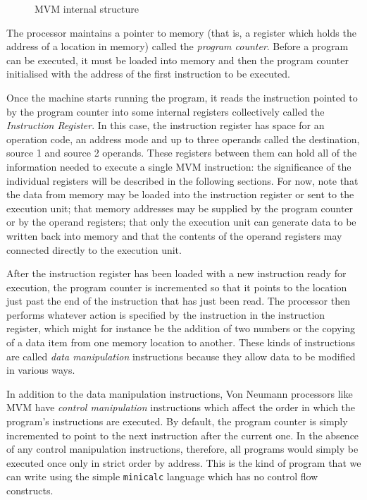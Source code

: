 \begin{figure}
\begin{center}\end{center}
\caption{MVM internal structure}
\label{MVM:block}
\end{figure}

The processor maintains a pointer to memory (that is, a register which
holds the address of a location in memory) called the {\em program
counter}. Before a program can be executed, it must be loaded into
memory and then the program counter initialised with the address of the first
instruction to be executed. 

Once the machine starts running the program, it reads the instruction
pointed to by the program counter into some internal registers
collectively called the {\em Instruction Register}. In this case, the
instruction register has space for an operation code, an address mode
and up to three operands called the destination, source 1 and source 2
operands. These registers between them can hold all of the information
needed to execute a single MVM instruction: the significance of the
individual registers will be described in the following sections. For
now, note that the data from memory may be loaded into the instruction
register or sent to the execution unit; that memory addresses may be
supplied by the program counter or by the operand registers; that only
the execution unit can generate data to be written back into memory and
that the contents of the operand registers may connected directly to the
execution unit.

After the instruction register has been loaded with a new instruction
ready for execution, the program counter is incremented so that it
points to the location just past the end of the instruction that has
just been read. The processor then performs whatever action is specified
by the instruction in the instruction register, which might for instance
be the addition of two numbers or the copying of a data item
from one memory location to another. These kinds of instructions are
called {\em data manipulation} instructions because they allow data to
be modified in various ways. 

In addition to the data manipulation instructions, Von Neumann processors
like MVM have {\em control manipulation} instructions which affect the
order in which the program's instructions are executed. By default, the
program counter is simply incremented to point to the next instruction
after the current one. In the absence of any control manipulation
instructions, therefore, all programs would simply be executed once only
in strict order by address. This is the kind of program that we can
write using the simple {\tt minicalc} language which has no control flow
constructs. 

